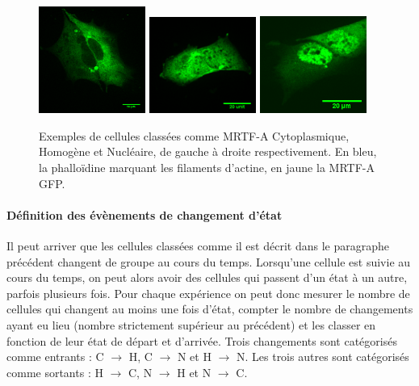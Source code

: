  \begin{figure}
  \includegraphics[width=3.5cm]{Figures/Exemple_C_GFP.png} 
 \includegraphics[width=3.5cm]{Figures/Exemple_H_GFP.png} 
 \includegraphics[width=3.5cm]{Figures/Exemple_N_2_GFP.png} 
 \caption{Exemples de cellules classées comme MRTF-A Cytoplasmique, Homogène et Nucléaire, de gauche à droite respectivement. En bleu, la phalloïdine marquant les filaments d'actine, en jaune la MRTF-A GFP.\label{Exemples_CHN}}

 \end{figure}
 
 \paragraph{Définition des évènements de changement d'état}
 
 Il peut arriver que les cellules classées comme il est décrit dans le paragraphe précédent changent de groupe au cours du temps. 
 Lorsqu'une cellule est suivie au cours du temps, on peut alors avoir des cellules qui passent d'un état à un autre, parfois plusieurs fois. 
 Pour chaque expérience on peut donc mesurer le nombre de cellules qui changent au moins une fois d'état, compter le nombre de changements ayant eu lieu (nombre strictement supérieur au précédent) et les classer en fonction de leur état de départ et d'arrivée. 
 Trois changements sont catégorisés comme \og entrants \fg : C $\rightarrow$ H, C $\rightarrow$ N et H $\rightarrow$ N. 
 Les trois autres sont catégorisés comme \og sortants \fg  : H $\rightarrow$ C, N $\rightarrow$ H et N $\rightarrow$ C. 
 
